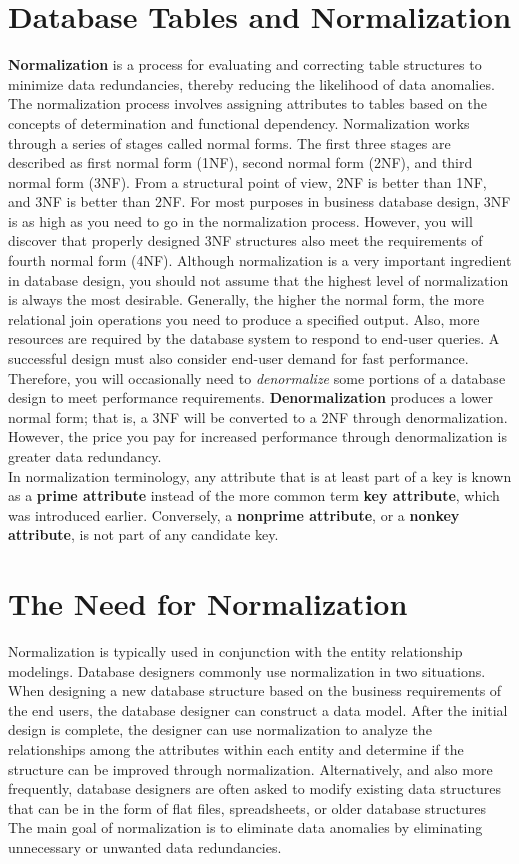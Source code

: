 \documentclass[a4paper, 12pt, titlepage]{report}
\begin{document}
{\section{Database Tables and Normalization}
\textbf{Normalization} is a process for evaluating and correcting table structures to minimize data redundancies, thereby reducing the likelihood of data anomalies. The normalization process involves assigning attributes to tables based on the concepts of determination and functional dependency. Normalization works through a series of stages called normal forms. The first three stages are described as first normal form (1NF), second normal form (2NF), and third normal form (3NF). From a structural point of view, 2NF is better than 1NF, and 3NF is better than 2NF. For most purposes in business database design, 3NF is as high as you need to go in the normalization process. However, you will discover that properly designed 3NF structures also meet the requirements of fourth normal form (4NF). Although normalization is a very important ingredient in database design, you
should not assume that the highest level of normalization is always the most desirable. Generally, the higher the normal form, the more relational join operations you need to produce a specified output. Also, more resources are required by the database system to respond to end-user queries. A successful design must also consider end-user demand for fast performance. Therefore, you will occasionally need to \emph{denormalize} some portions of a database design to meet performance requirements. \textbf{Denormalization} produces a lower normal form; that is, a 3NF will be converted to a 2NF through denormalization. However, the price you pay for increased performance through denormalization is greater data redundancy.\\
In normalization terminology, any attribute that is at least part of a key is known as a \textbf{prime attribute} instead of the more common term \textbf{key attribute}, which was introduced earlier. Conversely, a \textbf{nonprime attribute}, or a \textbf{nonkey attribute}, is not part of any candidate key.
\section{The Need for Normalization}
Normalization is typically used in conjunction with the entity relationship modelings. Database designers commonly use normalization in two situations. When designing a new database structure based on the business
requirements of the end users, the database designer can construct a data model. After the initial design is complete, the designer can use normalization to analyze the relationships among the attributes within
each entity and determine if the structure can be improved through normalization.
Alternatively, and also more frequently, database designers are often asked to modify existing data structures that can be in the form of flat files, spreadsheets, or older database structures The main goal of normalization is to eliminate data anomalies by eliminating unnecessary or unwanted data redundancies.
}
\end{document}
